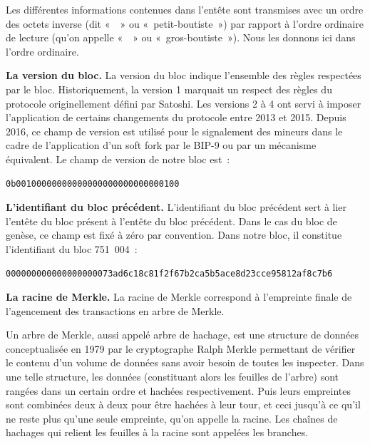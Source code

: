 Les différentes informations contenues dans l'entête sont transmises avec un ordre des octets inverse (dit «~~» ou «~petit-boutiste~») par rapport à l'ordre ordinaire de lecture (qu'on appelle «~~» ou «~gros-boutiste~»). Nous les donnons ici dans l'ordre ordinaire.


\textbf{La version du bloc.} La version du bloc indique l'ensemble des règles respectées par le bloc. Historiquement, la version 1 marquait un respect des règles du protocole originellement défini par Satoshi. Les versions 2 à 4 ont servi à imposer l'application de certains changements du protocole entre 2013 et 2015. Depuis 2016, ce champ de version est utilisé pour le signalement des mineurs dans le cadre de l'application d'un soft fork par le BIP-9 ou par un mécanisme équivalent. Le champ de version de notre bloc est~:

\begin{Verbatim}[fontsize=\footnotesize]
0b00100000000000000000000000000100
\end{Verbatim}


\textbf{L'identifiant du bloc précédent.} L'identifiant du bloc précédent sert à lier l'entête du bloc présent à l'entête du bloc précédent. Dans le cas du bloc de genèse, ce champ est fixé à zéro par convention. Dans notre bloc, il constitue l'identifiant du bloc 751~004~:

\begin{Verbatim}[fontsize=\footnotesize]
000000000000000000073ad6c18c81f2f67b2ca5b5ace8d23cce95812af8c7b6
\end{Verbatim}


\textbf{La racine de Merkle.} La racine de Merkle correspond à l'empreinte finale de l'agencement des transactions en arbre de Merkle.

Un arbre de Merkle, aussi appelé arbre de hachage, est une structure de données conceptualisée en 1979 par le cryptographe Ralph Merkle permettant de vérifier le contenu d'un volume de données sans avoir besoin de toutes les inspecter. Dans une telle structure, les données (constituant alors les feuilles de l'arbre) sont rangées dans un certain ordre et hachées respectivement. Puis leurs empreintes sont combinées deux à deux pour être hachées à leur tour, et ceci jusqu'à ce qu'il ne reste plus qu'une seule empreinte, qu'on appelle la racine. Les chaînes de hachages qui relient les feuilles à la racine sont appelées les branches.

